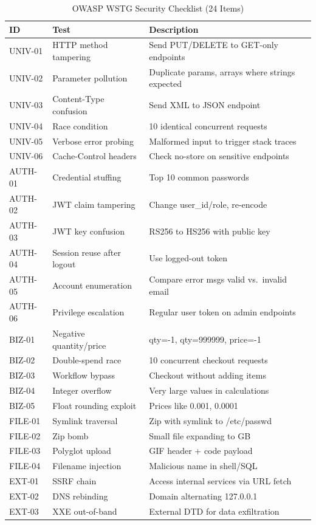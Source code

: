 \documentclass[conference,a4paper]{IEEEtran}
\begin{document}
\begin{table}[H]
\centering
\caption{OWASP WSTG Security Checklist (24 Items)}
\small
\begin{tabular}{lll}
\toprule
\textbf{ID} & \textbf{Test} & \textbf{Description} \\
\midrule
UNIV-01 & HTTP method tampering & Send PUT/DELETE to GET-only endpoints \\
UNIV-02 & Parameter pollution & Duplicate params, arrays where strings expected \\
UNIV-03 & Content-Type confusion & Send XML to JSON endpoint \\
UNIV-04 & Race condition & 10 identical concurrent requests \\
UNIV-05 & Verbose error probing & Malformed input to trigger stack traces \\
UNIV-06 & Cache-Control headers & Check no-store on sensitive endpoints \\
\midrule
AUTH-01 & Credential stuffing & Top 10 common passwords \\
AUTH-02 & JWT claim tampering & Change user\_id/role, re-encode \\
AUTH-03 & JWT key confusion & RS256 to HS256 with public key \\
AUTH-04 & Session reuse after logout & Use logged-out token \\
AUTH-05 & Account enumeration & Compare error msgs valid vs.\ invalid email \\
AUTH-06 & Privilege escalation & Regular user token on admin endpoints \\
\midrule
BIZ-01 & Negative quantity/price & qty=-1, qty=999999, price=-1 \\
BIZ-02 & Double-spend race & 10 concurrent checkout requests \\
BIZ-03 & Workflow bypass & Checkout without adding items \\
BIZ-04 & Integer overflow & Very large values in calculations \\
BIZ-05 & Float rounding exploit & Prices like 0.001, 0.0001 \\
\midrule
FILE-01 & Symlink traversal & Zip with symlink to /etc/passwd \\
FILE-02 & Zip bomb & Small file expanding to GB \\
FILE-03 & Polyglot upload & GIF header + code payload \\
FILE-04 & Filename injection & Malicious name in shell/SQL \\
\midrule
EXT-01 & SSRF chain & Access internal services via URL fetch \\
EXT-02 & DNS rebinding & Domain alternating 127.0.0.1 \\
EXT-03 & XXE out-of-band & External DTD for data exfiltration \\
\bottomrule
\end{tabular}
\end{table}
\end{document}
